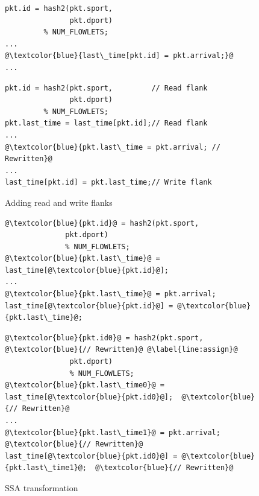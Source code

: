 \begin{figure}[!t]
  \begin{minipage}{0.43\textwidth}
  \begin{small}
  \begin{lstlisting}[style=customc]
pkt.id = hash2(pkt.sport,
               pkt.dport)
         % NUM_FLOWLETS;
...
@\textcolor{blue}{last\_time[pkt.id] = pkt.arrival;}@
...
  \end{lstlisting}
  \end{small}
  \end{minipage}
  \begin{minipage}{0.61\textwidth}
  \begin{small}
  \begin{lstlisting}[style=customc]
pkt.id = hash2(pkt.sport,         // Read flank
               pkt.dport)
         % NUM_FLOWLETS;
pkt.last_time = last_time[pkt.id];// Read flank
...
@\textcolor{blue}{pkt.last\_time = pkt.arrival; // Rewritten}@
...
last_time[pkt.id] = pkt.last_time;// Write flank
  \end{lstlisting}
  \end{small}
  \end{minipage}
  \caption{Adding read and write flanks}
\label{fig:stateful_flanks}
\end{figure}

\begin{figure}[!t]
  \begin{minipage}{0.43\textwidth}
  \begin{small}
  \begin{lstlisting}[style=customc]
@\textcolor{blue}{pkt.id}@ = hash2(pkt.sport,
              pkt.dport)
              % NUM_FLOWLETS;
@\textcolor{blue}{pkt.last\_time}@ = last_time[@\textcolor{blue}{pkt.id}@];
...
@\textcolor{blue}{pkt.last\_time}@ = pkt.arrival;
last_time[@\textcolor{blue}{pkt.id}@] = @\textcolor{blue}{pkt.last\_time}@;
  \end{lstlisting}
  \end{small}
  \end{minipage}
  \begin{minipage}{0.57\textwidth}
  \begin{small}
  \begin{lstlisting}[style=customc]
  @\textcolor{blue}{pkt.id0}@ = hash2(pkt.sport, @\textcolor{blue}{// Rewritten}@ @\label{line:assign}@
               pkt.dport)
               % NUM_FLOWLETS;
@\textcolor{blue}{pkt.last\_time0}@ = last_time[@\textcolor{blue}{pkt.id0}@];  @\textcolor{blue}{// Rewritten}@
...
@\textcolor{blue}{pkt.last\_time1}@ = pkt.arrival;  @\textcolor{blue}{// Rewritten}@
last_time[@\textcolor{blue}{pkt.id0}@] = @\textcolor{blue}{pkt.last\_time1}@;  @\textcolor{blue}{// Rewritten}@
  \end{lstlisting}
  \end{small}
  \end{minipage}
  \caption{SSA transformation\protect\footnotemark}
\label{fig:ssa}
\end{figure}

